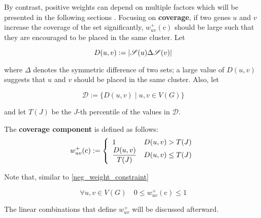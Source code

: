 By contrast, positive weights can depend on multiple factors which will be presented in the following sections . Focusing on \textbf{coverage}, if two genes $u$ and $v$ increase the coverage of the set significantly, $w_{uv}^+(\mathrm c)$ should be large such that they are encouraged to be placed in the same cluster. Let

\begin{equation}
    D(u, v) := \abs{\mathscr{S}(u) \Delta \mathscr{S}(v)}
\end{equation}

where $\Delta$ denotes the symmetric difference of two sets; a large value of $D(u, v)$ suggests that $u$ and $v$ should be placed in the same cluster. Also, let

\begin{equation}
    \mathscr{D} := \{D(u, v) \mid u, v \in V(G)\}
\end{equation}

and let $T(J)$ be the $J$-th percentile of the values in $\mathscr{D}$.

\begin{definition} \label{co_comp}
    The \textbf{coverage component} is defined as follows: $$w_{uv}^+(\mathrm c) := \soe{ll}{1 & D(u, v) > T(J) \\ \dfrac{D(u, v)}{T(J)} & D(u, v) \le T(J)}$$
\end{definition}

Note that, similar to \cref{neg_weight_constraint}

\begin{equation}
    \forall u, v \in V(G) \quad 0 \le w_{uv}^+(\mathrm c) \le 1
\end{equation}

The linear combinations that define $w_{uv}^+$ will be discussed afterward.

\cleardoublepage
